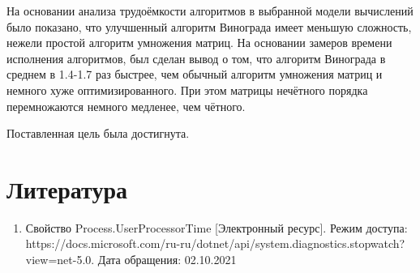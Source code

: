 \documentclass[12pt]{report}
\begin{document}
На основании анализа трудоёмкости алгоритмов в выбранной модели вычислений было показано, что улучшенный алгоритм Винограда имеет меньшую сложность, нежели простой алгоритм умножения матриц. На основании замеров времени исполнения алгоритмов, был сделан вывод о том, что алгоритм Винограда в среднем в 1.4-1.7 раз быстрее, чем обычный алгоритм умножения матриц и немного хуже оптимизированного. При этом матрицы нечётного порядка перемножаются немного медленее, чем чётного. 

Поставленная цель была достигнута.

\chapter*{Литература}
\begin{enumerate}
	\item Свойство Process.UserProcessorTime [Электронный ресурс]. Режим доступа: https://docs.microsoft.com/ru-ru/dotnet/api/system.diagnostics.stopwatch?view=net-5.0. Дата обращения: 02.10.2021
\end{enumerate}
\end{document}
